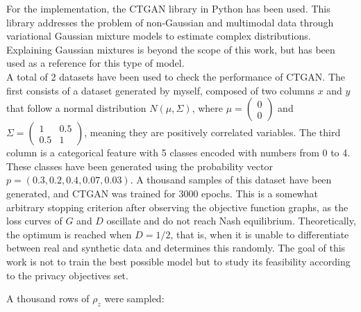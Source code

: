 For the implementation, the CTGAN library in Python has been used. This library addresses the problem of non-Gaussian and multimodal data through variational Gaussian mixture models to estimate complex distributions. Explaining Gaussian mixtures is beyond the scope of this work, but \cite*{bishop2006} has been used as a reference for this type of model.\\
A total of 2 datasets have been used to check the performance of CTGAN. The first consists of a dataset generated by myself, composed of two columns $x$ and $y$ that follow a normal distribution $N(\mu, \Sigma)$, where $\mu = \begin{pmatrix}
0 \\
0
\end{pmatrix}$ and $\Sigma = \begin{pmatrix}
1 & 0.5 \\
0.5 & 1
\end{pmatrix}$, meaning they are positively correlated variables. The third column is a categorical feature with 5 classes encoded with numbers from 0 to 4. These classes have been generated using the probability vector $p=(0.3, 0.2, 0.4, 0.07, 0.03)$. A thousand samples of this dataset have been generated, and CTGAN was trained for 3000 epochs. This is a somewhat arbitrary stopping criterion after observing the objective function graphs, as the loss curves of $G$ and $D$ oscillate and do not reach Nash equilibrium. Theoretically, the optimum is reached when $D = 1/2$, that is, when it is unable to differentiate between real and synthetic data and determines this randomly. The goal of this work is not to train the best possible model but to study its feasibility according to the privacy objectives set.

A thousand rows of $\rho_z$ were sampled:


